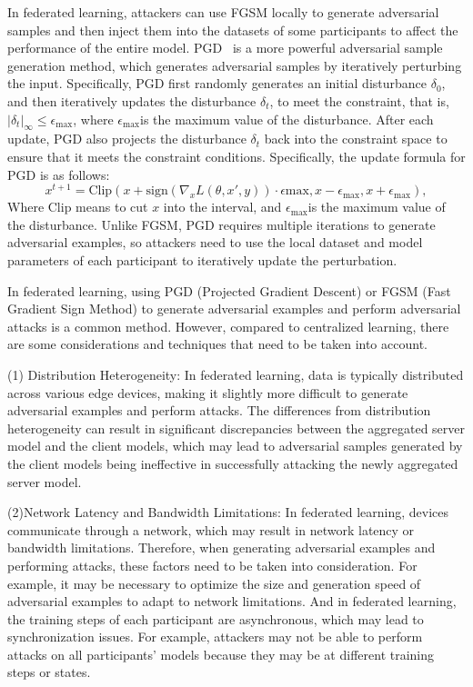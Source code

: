 \documentclass[pdflatex,sn-mathphys-num]{sn-jnl}%
\theoremstyle{thmstyleone}%
\theoremstyle{thmstyletwo}%
\theoremstyle{thmstylethree}%
\begin{document}
In federated learning, attackers can use FGSM locally
to generate adversarial samples and then inject them into
the datasets of some participants to affect the performance
of the entire model. PGD~\cite{madry2017towards} is a more powerful adversarial sample
generation method, which generates adversarial samples
by iteratively perturbing the input. Specifically, PGD
first randomly generates an initial disturbance $\delta_0$,
and then iteratively updates the disturbance $\delta_t$, to meet the constraint,
that is, $|\delta_t|_{\infty} \leq \epsilon_{\text{max}}$,
where $\epsilon_{\text{max}}$is the maximum value of the disturbance.
After each update, PGD also projects the disturbance
$\delta_t$ back into the constraint space to ensure that it meets the
constraint conditions.
Specifically, the update formula for PGD is as follows:
\begin{equation}
	x^{t+1} = \text{Clip}(x + \text{sign}(\nabla_x L(\theta,x',y)) \cdot \epsilon{\text{max}}, x - \epsilon_{\text{max}}, x + \epsilon_{\text{max}}),
\end{equation}
Where $\text{Clip}$ means to cut $x$ into the interval, and $\epsilon_ {\text{max}} $is the maximum value of the disturbance.
Unlike FGSM, PGD requires multiple iterations to generate adversarial examples,
so attackers need to use the local dataset and model parameters of each participant
to iteratively update the perturbation.

In federated learning, using PGD (Projected Gradient Descent) or FGSM
(Fast Gradient Sign Method) to generate adversarial examples and perform
adversarial attacks is a common method. However, compared to centralized
learning, there are some considerations and techniques that need to be
taken into account.

(1) Distribution Heterogeneity: In
federated learning, data is typically distributed across
various edge devices, making it slightly more diﬀicult to
generate adversarial examples and perform attacks.
The differences from distribution heterogeneity can result in significant discrepancies between the aggregated server model and the client models,
which may lead to adversarial samples generated by the client models being ineffective in successfully attacking the newly aggregated server model.


(2)Network Latency and Bandwidth Limitations:
In federated learning, devices communicate through a
network, which may result in network latency or
bandwidth limitations. Therefore, when generating adversarial
examples and performing attacks, these factors need to
be taken into consideration. For example, it may be
necessary to optimize the size and generation speed of
adversarial examples to adapt to network limitations. And
in federated learning, the training steps of each participant
are asynchronous, which may lead to synchronization
issues. For example, attackers may not be able to perform
attacks on all participants' models because they may be
at different training steps or states.
\end{document}
